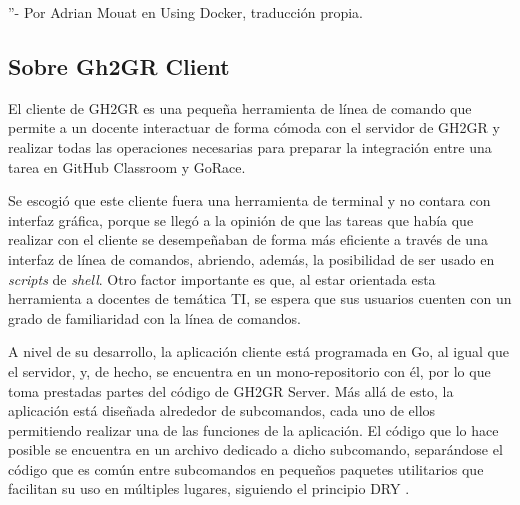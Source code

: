 ''- Por  Adrian Mouat en Using Docker\cite{Mouat2015-uh}, traducción propia.


\subsection{Sobre Gh2GR Client}
El cliente de GH2GR es una pequeña herramienta de línea de comando que permite a un docente interactuar de forma cómoda con el servidor de GH2GR y realizar todas las operaciones necesarias para preparar la integración entre una tarea en GitHub Classroom y GoRace.

Se escogió que este cliente fuera una herramienta de terminal y no contara con interfaz gráfica, porque se llegó a la opinión de que las tareas que había que realizar con el cliente se desempeñaban de forma más eficiente a través de una interfaz de línea de comandos, abriendo, además, la posibilidad de ser usado en \textit{scripts} de \textit{shell}. Otro factor importante es que, al estar orientada esta herramienta a docentes de temática \acrshort{TI}, se espera que sus usuarios cuenten con un grado de familiaridad con la línea de comandos.

A nivel de su desarrollo, la aplicación cliente está programada en Go, al igual que el servidor, y, de hecho, se encuentra en un mono-repositorio con él, por lo que toma prestadas partes del código de GH2GR Server. Más allá de esto, la aplicación está diseñada alrededor de subcomandos, cada uno de ellos permitiendo realizar una de las funciones de la aplicación. El código que lo hace posible se encuentra en un archivo dedicado a dicho subcomando, separándose el código que es común entre subcomandos en pequeños paquetes utilitarios que facilitan su uso en múltiples lugares, siguiendo el principio \acrshort{DRY} \cite{Hunt1999-sb}.

